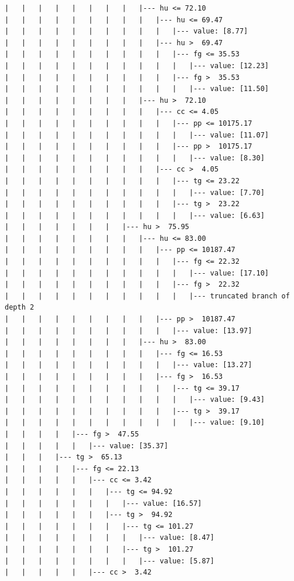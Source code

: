 \documentclass[UTF8, a4paper]{ctexart}
\begin{document}
\begin{lstlisting}
|   |   |   |   |   |   |   |   |--- hu <= 72.10
|   |   |   |   |   |   |   |   |   |--- hu <= 69.47
|   |   |   |   |   |   |   |   |   |   |--- value: [8.77]
|   |   |   |   |   |   |   |   |   |--- hu >  69.47
|   |   |   |   |   |   |   |   |   |   |--- fg <= 35.53
|   |   |   |   |   |   |   |   |   |   |   |--- value: [12.23]
|   |   |   |   |   |   |   |   |   |   |--- fg >  35.53
|   |   |   |   |   |   |   |   |   |   |   |--- value: [11.50]
|   |   |   |   |   |   |   |   |--- hu >  72.10
|   |   |   |   |   |   |   |   |   |--- cc <= 4.05
|   |   |   |   |   |   |   |   |   |   |--- pp <= 10175.17
|   |   |   |   |   |   |   |   |   |   |   |--- value: [11.07]
|   |   |   |   |   |   |   |   |   |   |--- pp >  10175.17
|   |   |   |   |   |   |   |   |   |   |   |--- value: [8.30]
|   |   |   |   |   |   |   |   |   |--- cc >  4.05
|   |   |   |   |   |   |   |   |   |   |--- tg <= 23.22
|   |   |   |   |   |   |   |   |   |   |   |--- value: [7.70]
|   |   |   |   |   |   |   |   |   |   |--- tg >  23.22
|   |   |   |   |   |   |   |   |   |   |   |--- value: [6.63]
|   |   |   |   |   |   |   |--- hu >  75.95
|   |   |   |   |   |   |   |   |--- hu <= 83.00
|   |   |   |   |   |   |   |   |   |--- pp <= 10187.47
|   |   |   |   |   |   |   |   |   |   |--- fg <= 22.32
|   |   |   |   |   |   |   |   |   |   |   |--- value: [17.10]
|   |   |   |   |   |   |   |   |   |   |--- fg >  22.32
|   |   |   |   |   |   |   |   |   |   |   |--- truncated branch of depth 2
|   |   |   |   |   |   |   |   |   |--- pp >  10187.47
|   |   |   |   |   |   |   |   |   |   |--- value: [13.97]
|   |   |   |   |   |   |   |   |--- hu >  83.00
|   |   |   |   |   |   |   |   |   |--- fg <= 16.53
|   |   |   |   |   |   |   |   |   |   |--- value: [13.27]
|   |   |   |   |   |   |   |   |   |--- fg >  16.53
|   |   |   |   |   |   |   |   |   |   |--- tg <= 39.17
|   |   |   |   |   |   |   |   |   |   |   |--- value: [9.43]
|   |   |   |   |   |   |   |   |   |   |--- tg >  39.17
|   |   |   |   |   |   |   |   |   |   |   |--- value: [9.10]
|   |   |   |   |--- fg >  47.55
|   |   |   |   |   |--- value: [35.37]
|   |   |   |--- tg >  65.13
|   |   |   |   |--- fg <= 22.13
|   |   |   |   |   |--- cc <= 3.42
|   |   |   |   |   |   |--- tg <= 94.92
|   |   |   |   |   |   |   |--- value: [16.57]
|   |   |   |   |   |   |--- tg >  94.92
|   |   |   |   |   |   |   |--- tg <= 101.27
|   |   |   |   |   |   |   |   |--- value: [8.47]
|   |   |   |   |   |   |   |--- tg >  101.27
|   |   |   |   |   |   |   |   |--- value: [5.87]
|   |   |   |   |   |--- cc >  3.42

\end{lstlisting}
\end{document}
